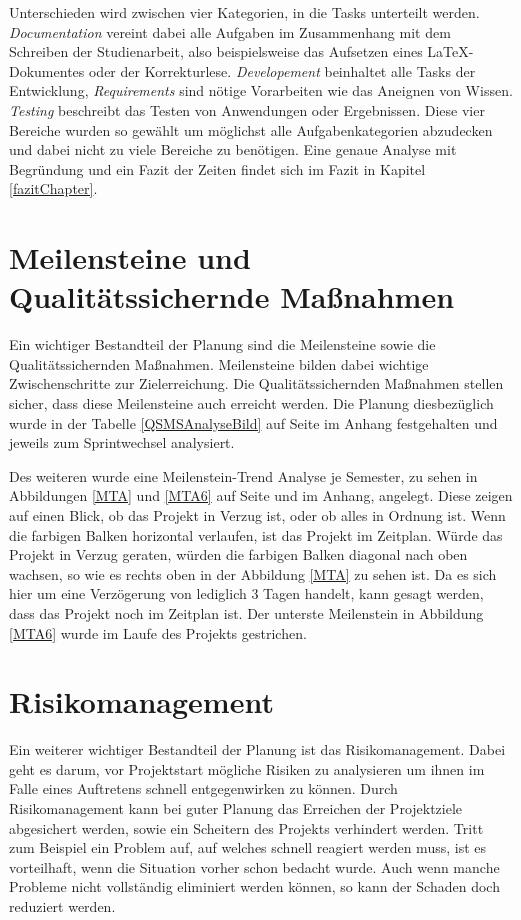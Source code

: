Unterschieden wird zwischen vier Kategorien, in die Tasks unterteilt werden. \textit{Documentation} vereint dabei alle Aufgaben im Zusammenhang mit dem Schreiben der Studienarbeit, also beispielsweise das Aufsetzen eines LaTeX-Dokumentes oder der Korrekturlese. \textit{Developement} beinhaltet alle Tasks der Entwicklung, \textit{Requirements} sind nötige Vorarbeiten wie das Aneignen von Wissen. \textit{Testing} beschreibt das Testen von Anwendungen oder Ergebnissen. Diese vier Bereiche wurden so gewählt um möglichst alle Aufgabenkategorien abzudecken und dabei nicht zu viele Bereiche zu benötigen. Eine genaue Analyse mit Begründung und ein Fazit der Zeiten findet sich im Fazit in Kapitel \ref{fazitChapter}.

\section{Meilensteine und Qualitätssichernde Maßnahmen}

Ein wichtiger Bestandteil der Planung sind die Meilensteine sowie die Qualitätssichernden Maßnahmen. Meilensteine bilden dabei wichtige Zwischenschritte zur Zielerreichung. Die Qualitätssichernden Maßnahmen stellen sicher, dass diese Meilensteine auch erreicht werden. Die Planung diesbezüglich wurde in der Tabelle \ref{QSMSAnalyseBild} auf Seite \pageref{QSMSAnalyseBild} im Anhang festgehalten und jeweils zum Sprintwechsel analysiert.

Des weiteren wurde eine Meilenstein-Trend Analyse je Semester, zu sehen in Abbildungen \ref{MTA} und \ref{MTA6} auf Seite \pageref{MTA} und \pageref{MTA6} im Anhang, angelegt. Diese zeigen auf einen Blick, ob das Projekt in Verzug ist, oder ob alles in Ordnung ist. Wenn die farbigen Balken horizontal verlaufen, ist das Projekt im Zeitplan. Würde das Projekt in Verzug geraten, würden die farbigen Balken diagonal nach oben wachsen, so wie es rechts oben in der Abbildung \ref{MTA} zu sehen ist. Da es sich hier um eine Verzögerung von lediglich 3 Tagen handelt, kann gesagt werden, dass das Projekt noch im Zeitplan ist. Der unterste Meilenstein in Abbildung \ref{MTA6} wurde im Laufe des Projekts gestrichen. 

\section{Risikomanagement}
\label{riskmanagementchapter}
Ein weiterer wichtiger Bestandteil der Planung ist das Risikomanagement. Dabei geht es darum, vor Projektstart mögliche Risiken zu analysieren um ihnen im Falle eines Auftretens schnell entgegenwirken zu können. Durch Risikomanagement kann bei guter Planung das Erreichen der Projektziele abgesichert werden, sowie ein Scheitern des Projekts verhindert werden. Tritt zum Beispiel ein Problem auf, auf welches schnell reagiert werden muss, ist es vorteilhaft, wenn die Situation vorher schon bedacht wurde. Auch wenn manche Probleme nicht vollständig eliminiert werden können, so kann der Schaden doch reduziert werden.

